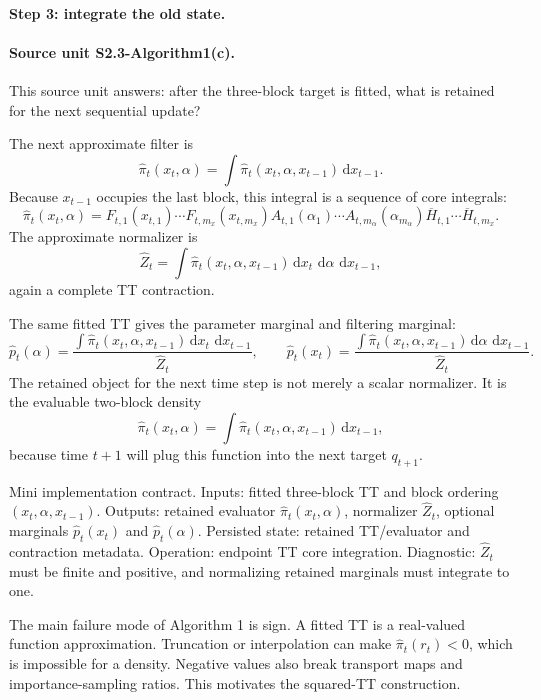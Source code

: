 \documentclass[11pt]{article}
\newcommand{\dd}{\,\mathrm d}
\begin{document}
\paragraph{Step 3: integrate the old state.}
\paragraph{Source unit S2.3-Algorithm1(c).}
This source unit answers: after the three-block target is fitted, what is
retained for the next sequential update?

The next approximate filter is
\[
    \widehat\pi_t(x_t,\alpha)
    =
    \int \widehat\pi_t(x_t,\alpha,x_{t-1})\dd x_{t-1}.
    \tag{A1-3}
\]
Because \(x_{t-1}\) occupies the last block, this integral is a sequence of core
integrals:
\[
    \widehat\pi_t(x_t,\alpha)
    =
    F_{t,1}(x_{t,1})\cdots F_{t,m_x}(x_{t,m_x})
    A_{t,1}(\alpha_1)\cdots A_{t,m_\alpha}(\alpha_{m_\alpha})
    \overline H_{t,1}\cdots \overline H_{t,m_x}.
    \tag{A1-4}
\]
The approximate normalizer is
\[
    \widehat Z_t
    =
    \int \widehat\pi_t(x_t,\alpha,x_{t-1})
    \dd x_t\,\dd\alpha\,\dd x_{t-1},
    \tag{A1-5}
\]
again a complete TT contraction.

The same fitted TT gives the parameter marginal and filtering marginal:
\[
    \widehat p_t(\alpha)
    =
    \frac{\int\widehat\pi_t(x_t,\alpha,x_{t-1})
    \dd x_t\,\dd x_{t-1}}
    {\widehat Z_t},
    \qquad
    \widehat p_t(x_t)
    =
    \frac{\int\widehat\pi_t(x_t,\alpha,x_{t-1})
    \dd\alpha\,\dd x_{t-1}}
    {\widehat Z_t}.
    \tag{A1-6}
\]
The retained object for the next time step is not merely a scalar
normalizer.  It is the evaluable two-block density
\[
    \widehat\pi_t(x_t,\alpha)
    =
    \int\widehat\pi_t(x_t,\alpha,x_{t-1})\dd x_{t-1},
    \tag{A1-7}
\]
because time \(t+1\) will plug this function into the next target
\(q_{t+1}\).

Mini implementation contract.  Inputs: fitted three-block TT and block ordering
\((x_t,\alpha,x_{t-1})\).  Outputs: retained evaluator
\(\widehat\pi_t(x_t,\alpha)\), normalizer \(\widehat Z_t\), optional marginals
\(\widehat p_t(x_t)\) and \(\widehat p_t(\alpha)\).  Persisted state: retained
TT/evaluator and contraction metadata.  Operation: endpoint TT core
integration.  Diagnostic: \(\widehat Z_t\) must be finite and positive, and
normalizing retained marginals must integrate to one.

The main failure mode of Algorithm 1 is sign.  A fitted TT is a real-valued
function approximation.  Truncation or interpolation can make
\(\widehat\pi_t(r_t)<0\), which is impossible for a density.  Negative values
also break transport maps and importance-sampling ratios.  This motivates the
squared-TT construction.
\end{document}
